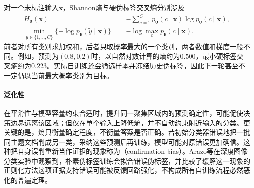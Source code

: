 对一个未标注输入$\bm{x}$，Shannon熵与硬伪标签交叉熵分别涉及
\begin{equation}
  \label{eq:classification-pseudolabel-entropy}
  \begin{aligned}
    H_{\bm{\theta}}(\bm{x})
      &=-\sum_{c=1}^{C}p_{\bm{\theta}}(c\mid\bm{x})
        \log p_{\bm{\theta}}(c\mid\bm{x}),\\
    \min_{\widetilde y\in\{1,\dots,C\}}
      \{-\log p_{\bm{\theta}}(\widetilde y\mid\bm{x})\}
      &=-\log\max_c p_{\bm{\theta}}(c\mid\bm{x}).
  \end{aligned}
\end{equation}
前者对所有类别求加权和，后者只取概率最大的一个类别，两者数值和梯度一般不同。例如，预测为$(0.8,0.2)$时，以自然对数计算的熵约为$0.500$，最小硬标签交叉熵约为$0.223$。实际自训练还会筛选样本并冻结历史伪标签，因此下一轮甚至不一定仍以当前最大概率类别为目标。

\paragraph{泛化性}
在平滑性与模型容量约束合适时，提升同一聚集区域内的预测确定性，可能促使决策边界远离该区域；但仅在单个输入上降低熵，并不自动约束附近输入的分类。更关键的是，熵只衡量确定程度，不衡量答案是否正确。若初始分类器错误地把一批同主题文档判成另一类，采纳这些预测后再训练，模型可能对原错误更加确信。这种把自身误判重新当作证据的现象称为（confirmation bias）。Arazo等在深度图像分类实验中观察到，朴素伪标签训练会拟合错误伪标签，并比较了缓解这一现象的正则化方法这项证据支持错误可能被反馈回路强化，不构成所有自训练流程必然恶化的普遍定理。

